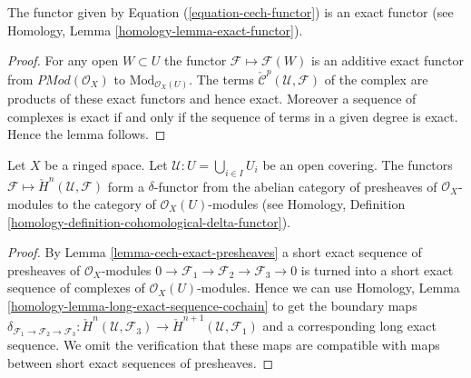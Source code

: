 \begin{lemma}
\label{lemma-cech-exact-presheaves}
The functor given by Equation (\ref{equation-cech-functor})
is an exact functor (see Homology, Lemma \ref{homology-lemma-exact-functor}).
\end{lemma}

\begin{proof}
For any open $W \subset U$ the functor
$\mathcal{F} \mapsto \mathcal{F}(W)$ is an additive exact functor
from $\textit{PMod}(\mathcal{O}_X)$ to $\text{Mod}_{\mathcal{O}_X(U)}$.
The terms
$\check{\mathcal{C}}^p(\mathcal{U}, \mathcal{F})$
of the complex are products of these exact functors and hence exact.
Moreover a sequence of complexes is exact if and only if the sequence
of terms in a given degree is exact. Hence the lemma follows.
\end{proof}

\begin{lemma}
\label{lemma-cech-cohomology-delta-functor-presheaves}
Let $X$ be a ringed space.
Let $\mathcal{U} : U = \bigcup_{i \in I} U_i$ be an open covering.
The functors $\mathcal{F} \mapsto \check{H}^n(\mathcal{U}, \mathcal{F})$
form a $\delta$-functor from the abelian category of
presheaves of $\mathcal{O}_X$-modules to the category
of $\mathcal{O}_X(U)$-modules (see
Homology, Definition \ref{homology-definition-cohomological-delta-functor}).
\end{lemma}

\begin{proof}
By
Lemma \ref{lemma-cech-exact-presheaves}
a short exact sequence of presheaves of
$\mathcal{O}_X$-modules
$0 \to \mathcal{F}_1 \to \mathcal{F}_2 \to \mathcal{F}_3 \to 0$
is turned into a short exact sequence of complexes of
$\mathcal{O}_X(U)$-modules. Hence we can use
Homology, Lemma \ref{homology-lemma-long-exact-sequence-cochain}
to get the boundary maps
$\delta_{\mathcal{F}_1 \to \mathcal{F}_2 \to \mathcal{F}_3} :
\check{H}^n(\mathcal{U}, \mathcal{F}_3) \to
\check{H}^{n + 1}(\mathcal{U}, \mathcal{F}_1)$
and a corresponding long exact sequence. We omit the verification
that these maps are compatible with maps between short exact
sequences of presheaves.
\end{proof}


